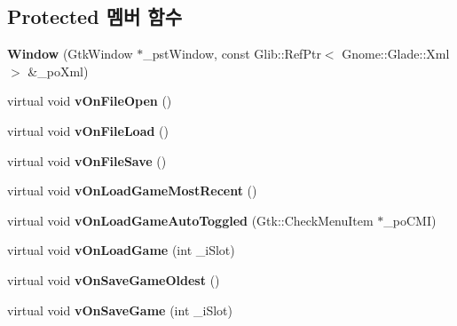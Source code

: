 \subsection*{Protected 멤버 함수}
\begin{DoxyCompactItemize}
\item 
\mbox{\label{class_v_b_a_1_1_window_a747763400ba237d06f6e01577998f6ab}} 
{\bfseries Window} (Gtk\+Window $\ast$\+\_\+pst\+Window, const Glib\+::\+Ref\+Ptr$<$ Gnome\+::\+Glade\+::\+Xml $>$ \&\+\_\+po\+Xml)
\item 
\mbox{\label{class_v_b_a_1_1_window_a8495a133642f2f0428d9487c86c8a231}} 
virtual void {\bfseries v\+On\+File\+Open} ()
\item 
\mbox{\label{class_v_b_a_1_1_window_a74bd51bc1e0e699d5523ad7828031394}} 
virtual void {\bfseries v\+On\+File\+Load} ()
\item 
\mbox{\label{class_v_b_a_1_1_window_a27bb0ed15cc90758c95eb11fddd14a86}} 
virtual void {\bfseries v\+On\+File\+Save} ()
\item 
\mbox{\label{class_v_b_a_1_1_window_ac73a836767434700186832ae1ea49cc5}} 
virtual void {\bfseries v\+On\+Load\+Game\+Most\+Recent} ()
\item 
\mbox{\label{class_v_b_a_1_1_window_a9457e3b8fe1022c96a548e1169002f0c}} 
virtual void {\bfseries v\+On\+Load\+Game\+Auto\+Toggled} (Gtk\+::\+Check\+Menu\+Item $\ast$\+\_\+po\+C\+MI)
\item 
\mbox{\label{class_v_b_a_1_1_window_a18461a94955930d3e10fdb093322d7a9}} 
virtual void {\bfseries v\+On\+Load\+Game} (int \+\_\+i\+Slot)
\item 
\mbox{\label{class_v_b_a_1_1_window_ac582c9416136eaaf39469fc9eff83fee}} 
virtual void {\bfseries v\+On\+Save\+Game\+Oldest} ()
\item 
\mbox{\label{class_v_b_a_1_1_window_aa614f13101a25febb6f3c3805c947e3e}} 
virtual void {\bfseries v\+On\+Save\+Game} (int \+\_\+i\+Slot)
\item 

\end{DoxyCompactItemize}
